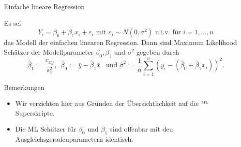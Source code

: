 \documentclass[
  8pt,
  ignorenonframetext,
]{beamer}
\providecommand{\tightlist}{%
  \setlength{\itemsep}{0pt}\setlength{\parskip}{0pt}}
\begin{document}
\begin{frame}{Einfache lineare Regression}
\protect\hypertarget{einfache-lineare-regression-6}{}
\small
\begin{theorem}
\justifying
\normalfont
Es sei
\begin{equation}\label{eq:modell}
Y_i = \beta_0 + \beta_1x_i + \varepsilon_{i} \mbox{ mit } \varepsilon_i \sim N(0,\sigma^2) \mbox{ u.i.v. für } i = 1,...,n
\end{equation}
das Modell der einfachen linearen Regression. Dann sind Maximum Likelihood
Schätzer der Modellparameter $\beta_0,\beta_1$ und $\sigma^2$ gegeben durch
\begin{equation}
\hat{\beta}_1  := \frac{c_{xy}}{s_x^2}, \,\,\,
\hat{\beta}_0  := \bar{y} - \hat{\beta}_1\bar{x} \,\,\,
\mbox{ und }
\hat{\sigma}^2 := \frac{1}{n}\sum_{i=1}^n \left(y_i - \left(\hat{\beta}_0 + \hat{\beta}_1 x_i\right)\right)^2.
\end{equation}
\end{theorem}

\footnotesize

Bemerkungen

\begin{itemize}
\tightlist
\item
  Wir verzichten hier aus Gründen der Übersichtlichkeit auf die
  \(^{\tiny \mbox{ML}}\) Superskripte.
\item
  Die ML Schätzer für \(\beta_0\) und \(\beta_1\) sind offenbar mit den
  Ausgleichsgeradenparametern identisch.
\end{itemize}
\end{frame}
\end{document}
